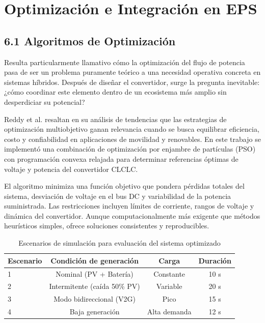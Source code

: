 \section{Optimización e Integración en EPS}

\subsection{6.1 Algoritmos de Optimización}

Resulta particularmente llamativo cómo la optimización del flujo de potencia pasa de ser un problema puramente teórico a una necesidad operativa concreta en sistemas híbridos. Después de diseñar el convertidor, surge la pregunta inevitable: ¿cómo coordinar este elemento dentro de un ecosistema más amplio sin desperdiciar su potencial?

Reddy et al. \cite{Reddy2025} resaltan en su análisis de tendencias que las estrategias de optimización multiobjetivo ganan relevancia cuando se busca equilibrar eficiencia, costo y confiabilidad en aplicaciones de movilidad y renovables. En este trabajo se implementó una combinación de optimización por enjambre de partículas (PSO) con programación convexa relajada para determinar referencias óptimas de voltaje y potencia del convertidor CLCLC.

El algoritmo minimiza una función objetivo que pondera pérdidas totales del sistema, desviación de voltaje en el bus DC y variabilidad de la potencia suministrada. Las restricciones incluyen límites de corriente, rangos de voltaje y dinámica del convertidor. Aunque computacionalmente más exigente que métodos heurísticos simples, ofrece soluciones consistentes y reproducibles.

\begin{table}[h]
\centering
\caption{Escenarios de simulación para evaluación del sistema optimizado}
\label{tab:escenarios}
\begin{tabular}{lccc}
\hline
Escenario & Condición de generación & Carga & Duración \\
\hline
1 & Nominal (PV + Batería) & Constante & 10 s \\
2 & Intermitente (caída 50\% PV) & Variable & 20 s \\
3 & Modo bidireccional (V2G) & Pico & 15 s \\
4 & Baja generación & Alta demanda & 12 s \\
\hline
\end{tabular}
\end{table}


